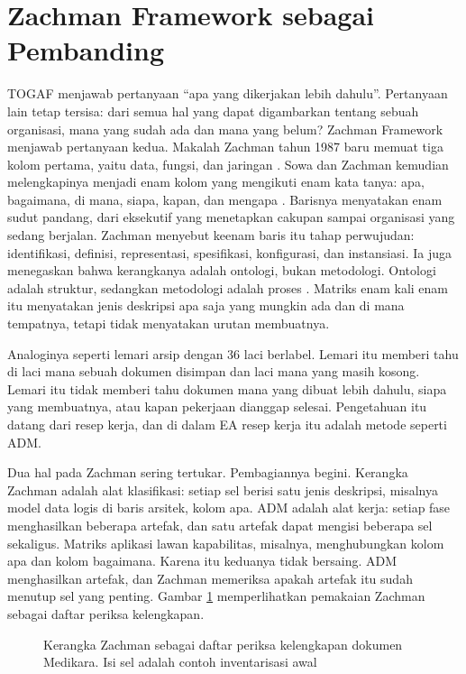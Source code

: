 \section{Zachman Framework sebagai Pembanding}

TOGAF menjawab pertanyaan ``apa yang dikerjakan lebih dahulu''. Pertanyaan
lain tetap tersisa: dari semua hal yang dapat digambarkan tentang sebuah
organisasi, mana yang sudah ada dan mana yang belum? Zachman Framework
menjawab pertanyaan kedua. Makalah Zachman tahun 1987 baru memuat tiga kolom
pertama, yaitu data, fungsi, dan jaringan \cite{zachman1987}. Sowa dan
Zachman kemudian melengkapinya menjadi enam kolom yang mengikuti enam kata
tanya: apa, bagaimana, di mana, siapa, kapan, dan mengapa
\cite{c02-sowa1992}. Barisnya menyatakan enam sudut pandang, dari eksekutif
yang menetapkan cakupan sampai organisasi yang sedang berjalan. Zachman
menyebut keenam baris itu tahap perwujudan: identifikasi, definisi,
representasi, spesifikasi, konfigurasi, dan instansiasi. Ia juga menegaskan
bahwa kerangkanya adalah ontologi, bukan metodologi. Ontologi adalah
struktur, sedangkan metodologi adalah proses \cite{c02-zachman-ontologi}.
Matriks enam kali enam itu menyatakan jenis deskripsi apa saja yang mungkin
ada dan di mana tempatnya, tetapi tidak menyatakan urutan membuatnya.

Analoginya seperti lemari arsip dengan 36 laci berlabel. Lemari itu memberi
tahu di laci mana sebuah dokumen disimpan dan laci mana yang masih kosong.
Lemari itu tidak memberi tahu dokumen mana yang dibuat lebih dahulu, siapa
yang membuatnya, atau kapan pekerjaan dianggap selesai. Pengetahuan itu
datang dari resep kerja, dan di dalam EA resep kerja itu adalah metode
seperti ADM.

Dua hal pada Zachman sering tertukar. Pembagiannya begini. Kerangka Zachman
adalah alat klasifikasi: setiap sel berisi satu jenis deskripsi, misalnya
model data logis di baris arsitek, kolom apa. ADM adalah alat kerja: setiap
fase menghasilkan beberapa artefak, dan satu artefak dapat mengisi beberapa
sel sekaligus. Matriks aplikasi lawan kapabilitas, misalnya, menghubungkan
kolom apa dan kolom bagaimana. Karena itu keduanya tidak bersaing. ADM
menghasilkan artefak, dan Zachman memeriksa apakah artefak itu sudah menutup
sel yang penting. Gambar \ref{fig:ch02-zachman-medikara} memperlihatkan
pemakaian Zachman sebagai daftar periksa kelengkapan.

\begin{figure}[!htb]
  \centering
  
  \caption{Kerangka Zachman sebagai daftar periksa kelengkapan dokumen
           Medikara. Isi sel adalah contoh inventarisasi awal}
  \label{fig:ch02-zachman-medikara}
\end{figure}

